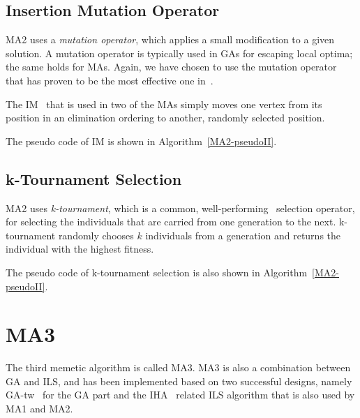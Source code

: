 \documentclass[thesis.tex]{subfiles}
\begin{document}
\subsection{Insertion Mutation Operator}
   \label{IM-desc}
%
\gls{MA2} uses a \emph{mutation operator}, which applies a small modification to a given solution. A mutation operator is typically used in \glspl{GA} for escaping local optima; the same holds for \glspl{MA}. Again, we have chosen to use the mutation operator that has proven to be the most effective one in~\parencite{schafhauser-thesis,schafhauser-paper}.

The \gls{IM}~\cite{Michalewicz92} that is used in two of the \glspl{MA} simply moves one vertex from its position in an elimination ordering to another, randomly selected position.

The pseudo code of \gls{IM} is shown in Algorithm~\vref{MA2-pseudoII}.

\subsection{k-Tournament Selection}
   \label{k-tournament-desc}
%
\gls{MA2} uses \emph{k-tournament}, which is a common, well-performing~\parencite{EA-design-choices} selection operator, for selecting the individuals that are carried from one generation to the next. k-tournament randomly chooses $k$ individuals from a generation and returns the individual with the highest fitness.

The pseudo code of k-tournament selection is also shown in Algorithm~\vref{MA2-pseudoII}.




\section{MA3}  %
   \label{sec:MA3}
%
   The third memetic algorithm is called \gls{MA3}. \gls{MA3} is also a combination between \gls{GA} and \gls{ILS}, and has been implemented based on two successful designs, namely \gls{GA-tw}~\parencite{schafhauser-thesis,schafhauser-paper} for the \gls{GA} part and the \gls{IHA}~\parencite{musliu-2008-ILS} related \gls{ILS} algorithm that is also used by \gls{MA1} and \gls{MA2}.
\end{document}
